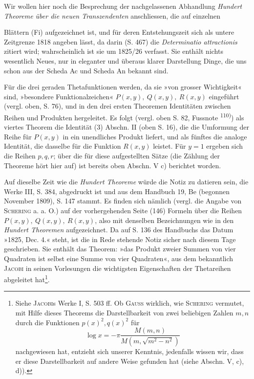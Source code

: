 \begin{center}\end{center}
\noindent\hspace*{\parindent}Wir wollen hier noch die Besprechung der nachgelassenen Abhandlung
\textit{Hundert Theoreme über die neuen Transzendenten} anschliessen, die auf einzelnen
\par\clearpage{}
\noindent Blättern (Fi) aufgezeichnet ist, und für deren Entstehungszeit sich als untere
Zeitgrenze 1818 angeben lässt, da darin (S. 467) die \textit{Determinatio attractionis}
zitiert wird; wahrscheinlich ist sie um 1825/26 verfasst. Sie enthält nichts
wesentlich Neues, nur in eleganter und überaus klarer Darstellung Dinge, die
uns schon aus der Scheda Ac und Scheda An bekannt sind.

Für die drei geraden Thetafunktionen werden, da sie »von grosser Wichtigkeit«
sind, »besondere Funktionalzeichen« \(P(x,y),\ Q(x,y),\ R(x,y)\) eingeführt
(vergl. oben, S. 76), und in den drei ersten Theoremen Identitäten zwischen
Reihen und Produkten hergeleitet. Es folgt (vergl. oben S. 82, Fussnote \textsuperscript{110)})
als viertes Theorem die Identität (3) Abschn. II (oben S. 16), die die Umformung
der Reihe für \(P(x,y)\) in ein unendliches Produkt liefert, und als
fünftes die analoge Identität, die dasselbe für die Funktion \(R(x,y)\) leistet.
Für \(y=1\) ergeben sich die Reihen \(p,q,r\); über die für diese aufgestellten
Sätze (die Zählung der Theoreme hört hier auf) ist bereits oben Abschn. V c)
berichtet worden.

Auf dieselbe Zeit wie die \textit{Hundert Theoreme} würde die Notiz zu datieren
sein, die Werke III, S. 384, abgedruckt ist und aus dem Handbuch 19, Be
(begonnen November 1809), S. 147 stammt. Es finden sich nämlich (vergl.
die Angabe von \textsc{Schering} a. a. O.) auf der vorhergehenden Seite (146) Formeln
über die Reihen \(P(x,y),\ Q(x,y),\ R(x,y)\), also mit denselben Bezeichnungen
wie in den \textit{Hundert Theoremen} aufgezeichnet. Da auf S. 136 des Handbuchs
das Datum »1825, Dec. 4.« steht, ist die in Rede stehende Notiz sicher nach
diesem Tage geschrieben. Sie enthält das Theorem: »das Produkt zweier
Summen von vier Quadraten ist selbst eine Summe von vier Quadraten«, aus
dem bekanntlich \textsc{Jacobi} in seinen Vorlesungen die wichtigsten Eigenschaften
der Thetareihen abgeleitet hat\footnote{Siehe \textsc{Jacobi}s Werke I, S. 503 ff. Ob \textsc{Gauss} wirklich, wie \textsc{Schering} vermutet, mit Hilfe dieses Theorems die Darstellbarkeit von zwei beliebigen Zahlen \(m,n\) durch die Funktionen \(p(x)^2,q(x)^2\) für
\[
\log x=-\pi\frac{M(m,n)}{M(m,\sqrt{m^2-n^2})}
\]
nachgewiesen hat, entzieht sich unserer Kenntnis, jedenfalls wissen wir, dass er diese Darstellbarkeit auf andere Weise gefunden hat (siehe Abschn. V, c), d)).}.

